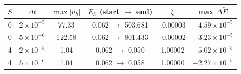 \begin{tabular}{cc cccc}
\toprule
$S$ & $\Delta t$ & $\max|u_h|$ & $E_h$ (start $\to$ end) & $\xi$ & max $\Delta\tilde E$\\
\midrule
0 & $2{\times}10^{-5}$ & 77.33 & 0.062 $\to$ 503.681 & -0.00003 & $-4.59{\times}10^{-5}$\\
0 & $5{\times}10^{-6}$ & 122.58 & 0.062 $\to$ 801.433 & -0.00002 & $-3.23{\times}10^{-5}$\\
4 & $2{\times}10^{-5}$ & 1.04 & 0.062 $\to$ 0.050 & 1.00002 & $-5.02{\times}10^{-5}$\\
4 & $5{\times}10^{-6}$ & 1.04 & 0.062 $\to$ 0.058 & 1.00000 & $-2.27{\times}10^{-5}$\\
\bottomrule
\end{tabular}
